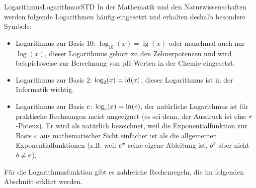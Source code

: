 \begin{MXContent}{Logarithmus}{Logarithmus}{STD}
In der Mathematik und den Naturwissenschaften werden folgende Logarithmen häufig eingesetzt und erhalten deshalb besondere Symbole:
\begin{itemize}
\item{Logarithmus zur Basis $10$: $\log_{10}(x)=\lg(x)$ oder manchmal auch nur $\log(x)$, dieser Logarithmus gehört zu den Zehnerpotenzen und wird beispielsweise zur Berechnung von pH-Werten in der Chemie eingesetzt.}
\item{Logarithmus zur Basis $2$: $\log_2(x)=\operatorname{ld}(x)$, dieser Logarithmus ist in der Informatik wichtig.}
\item{Logarithmus zur Basis $e$: $\log_e(x)=\ln(e)$, der natürliche Logarithmus ist für praktische Rechnungen meist ungeeignet (es sei denn,
der Ausdruck ist eine $e$-Potenz). Er wird als natürlich bezeichnet, weil die Exponentialfunktion zur Basis $e$ aus mathematischer Sicht einfacher ist
als die allgemeinen Exponentialfunktionen (z.B. weil $e^x$ seine eigene Ableitung ist, $b^x$ aber nicht $b\not=e$).}
\end{itemize}

Für die Logarithmusfunktion gibt es zahlreiche Rechenregeln, die im folgenden Abschnitt erklärt werden.

\end{MXContent}



